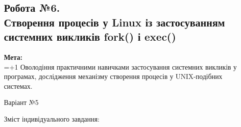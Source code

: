 \documentclass[a4paper,12pt]{article}
\begin{document}
\newpage
    \begin{center}
        \section*{\bfseries{Робота №6.\\
        Створення процесів у Linux із
        застосуванням системних викликів fork() і exec()
        }}
    \end{center}
    \textbf{Мета:} \\
    \hangindent=1.5cm 
    \hangafter=+1 \noindent
    Оволодіння практичними навичками застосування системних викликів у програмах, дослідження
    механізму створення процесів у UNIX-подібних системах. \\
    \begin{center}
        \Large{Варіант №5}
    \end{center}
    Зміст індивідуального завдання:
\end{document}
